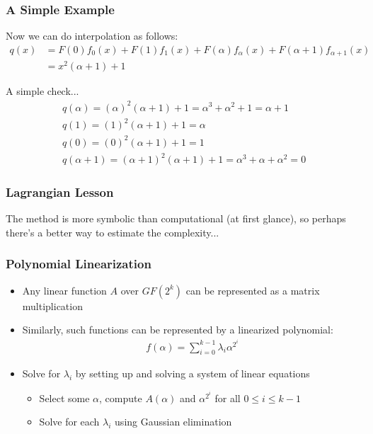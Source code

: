 \documentclass[handout]{beamer}
\begin{document}
\begin{frame}
	\frametitle{A Simple Example}
	Now we can do interpolation as follows:
	\begin{align*}
		q(x)& = F(0)f_0(x) + F(1)f_1(x) + F(\alpha)f_{\alpha}(x) + F(\alpha+1)f_{\alpha+1}(x)\\
		& = x^2(\alpha + 1) + 1
	\end{align*}
	
	\medskip
	
	A simple check...
	\begin{align*}
		q(\alpha)  = (\alpha)^2(\alpha + 1) + 1 = \alpha^3 + \alpha^2 + 1 = \alpha + 1\\
		q(1) = (1)^2(\alpha + 1) + 1 = \alpha\\
		q(0) = (0)^2(\alpha + 1) + 1 = 1 \\
		q(\alpha + 1) = (\alpha + 1)^2(\alpha + 1) + 1 = \alpha^3 + \alpha + \alpha^2 = 0 
	\end{align*}
\end{frame}

\begin{frame}
	\frametitle{Lagrangian Lesson}
	The method is more symbolic than computational (at first glance), so perhaps there's a better way
	to estimate the complexity...
\end{frame}

\begin{frame}
	\frametitle{Polynomial Linearization}
	\begin{itemize}
		\item Any linear function $A$ over $GF(2^k)$ can be represented as a matrix multiplication
		\item Similarly, such functions can be represented by a linearized polynomial:
		\begin{align*}
			f(\alpha) = \sum_{i = 0}^{k-1}\lambda_i \alpha^{2^{i}}
		\end{align*}
		\item Solve for $\lambda_i$ by setting up and solving a system of linear equations 
		\begin{itemize}
			\item Select some $\alpha$, compute $A(\alpha)$ and $\alpha^{2^{i}}$ for all $0 \leq i \leq k-1$
			\item Solve for each $\lambda_i$ using Gaussian elimination
		\end{itemize}
	\end{itemize} 
\end{frame}
\end{document}
